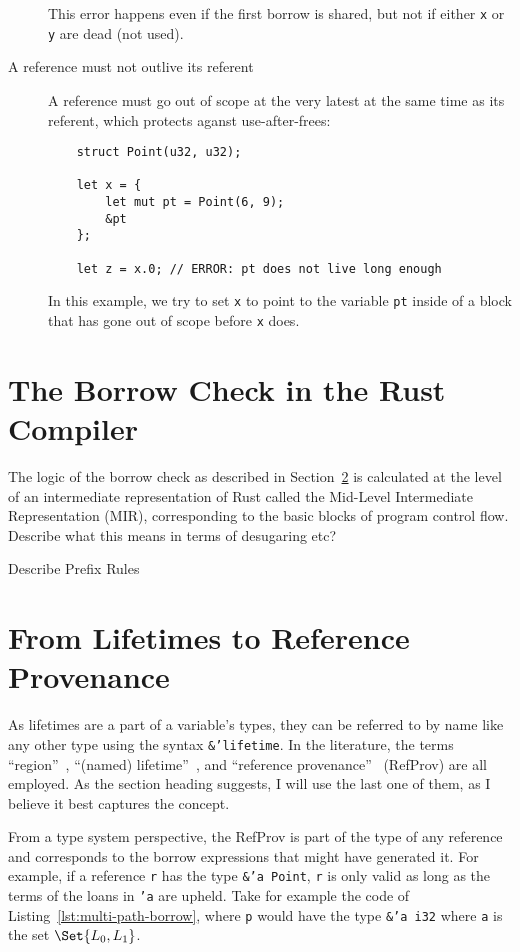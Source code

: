 \documentclass{UUThesisTemplate}
\newcommand{\fixme}[1] {{\color{red}#1}}
\newcommand{\InRust}[1]{\texttt{#1}}
\begin{document}
\begin{description}
  This error happens even if the first borrow is shared, but not if
  either \InRust{x} or \InRust{y} are dead (not used).
  
\item[A reference must not outlive its referent] A reference must go out of
  scope at the very latest at the same time as its referent, which protects
  aganst use-after-frees:
  \begin{verbatim}
    struct Point(u32, u32);
    
    let x = {
        let mut pt = Point(6, 9);
        &pt
    };
    
    let z = x.0; // ERROR: pt does not live long enough
  \end{verbatim}

  In this example, we try to set \InRust{x} to point to the variable \InRust{pt}
  inside of a block that has gone out of scope before \InRust{x} does.
\end{description}


\section{The Borrow Check in the Rust Compiler}
\label{sec:rust-specificts}

The logic of the borrow check as described in
Section~\ref{sec:reference-provenance} is calculated at the level of an
intermediate representation of Rust called the Mid-Level Intermediate
Representation (MIR), corresponding to the basic blocks of program control flow.
\fixme{Describe what this means in terms of desugaring etc?}

\fixme{Describe Prefix Rules}

\section{From Lifetimes to Reference Provenance}
\label{sec:reference-provenance}

As lifetimes are a part of a variable's types, they can be referred to by name
like any other type using the syntax \InRust{&'lifetime}. In the literature, the
terms ``region''~\cite{matsakis_alias-based_2018}, ``(named)
lifetime''~\nocite{noauthor_rfc_2019}, and ``reference
provenance''~\cite{weiss_oxide:_2019} (RefProv) are all employed. As the section
heading suggests, I will use the last one of them, as I believe it best captures
the concept.

From a type system perspective, the RefProv is part of the type of
any reference and corresponds to the borrow expressions that might have
generated it. For example, if a reference \InRust{r} has the type \InRust{&'a
  Point}, \InRust{r} is only valid as long as the terms of the loans in
\InRust{'a} are upheld. Take for example the code of
Listing~\ref{lst:multi-path-borrow}, where \InRust{p} would have the type
\InRust{&'a i32} where \InRust{a} is the set $\Set{L_0, L_1}$.
\end{document}
